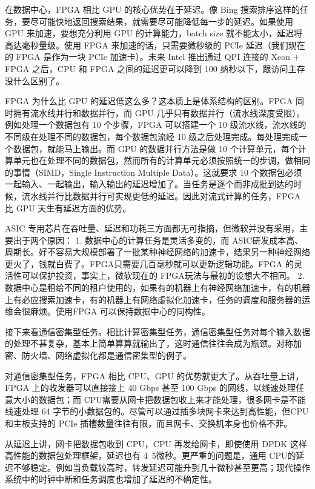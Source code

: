 在数据中心，FPGA 相比 GPU 的核心优势在于延迟。像 Bing 搜索排序这样的任务，要尽可能快地返回搜索结果，就需要尽可能降低每一步的延迟。如果使用 GPU 来加速，要想充分利用 GPU 的计算能力，batch size 就不能太小，延迟将高达毫秒量级。使用 FPGA 来加速的话，只需要微秒级的 PCIe 延迟（我们现在的 FPGA 是作为一块 PCIe 加速卡）。未来 Intel 推出通过 QPI 连接的 Xeon + FPGA 之后，CPU 和 FPGA 之间的延迟更可以降到 100 纳秒以下，跟访问主存没什么区别了。

FPGA 为什么比 GPU 的延迟低这么多？这本质上是体系结构的区别。FPGA 同时拥有流水线并行和数据并行，而 GPU 几乎只有数据并行（流水线深度受限）。例如处理一个数据包有 10 个步骤，FPGA 可以搭建一个 10 级流水线，流水线的不同级在处理不同的数据包，每个数据包流经 10 级之后处理完成。每处理完成一个数据包，就能马上输出。而 GPU 的数据并行方法是做 10 个计算单元，每个计算单元也在处理不同的数据包，然而所有的计算单元必须按照统一的步调，做相同的事情（SIMD，Single Instruction Multiple Data）。这就要求 10 个数据包必须一起输入、一起输出，输入输出的延迟增加了。当任务是逐个而非成批到达的时候，流水线并行比数据并行可实现更低的延迟。因此对流式计算的任务，FPGA 比 GPU 天生有延迟方面的优势。

ASIC 专用芯片在吞吐量、延迟和功耗三方面都无可指摘，但微软并没有采用，主要出于两个原因：
1.	数据中心的计算任务是灵活多变的，而 ASIC研发成本高、周期长。好不容易大规模部署了一批某种神经网络的加速卡，结果另一种神经网络更火了，钱就白费了。FPGA只需要几百毫秒就可以更新逻辑功能。FPGA 的灵活性可以保护投资，事实上，微软现在的 FPGA玩法与最初的设想大不相同。
2.	数据中心是租给不同的租户使用的，如果有的机器上有神经网络加速卡，有的机器上有必应搜索加速卡，有的机器上有网络虚拟化加速卡，任务的调度和服务器的运维会很麻烦。使用FPGA 可以保持数据中心的同构性。

接下来看通信密集型任务。相比计算密集型任务，通信密集型任务对每个输入数据的处理不甚复杂，基本上简单算算就输出了，这时通信往往会成为瓶颈。对称加密、防火墙、网络虚拟化都是通信密集型的例子。

对通信密集型任务，FPGA 相比 CPU、GPU 的优势就更大了。从吞吐量上讲，FPGA 上的收发器可以直接接上 40 Gbps 甚至 100 Gbps 的网线，以线速处理任意大小的数据包；而 CPU需要从网卡把数据包收上来才能处理，很多网卡是不能线速处理 64 字节的小数据包的。尽管可以通过插多块网卡来达到高性能，但CPU 和主板支持的 PCIe 插槽数量往往有限，而且网卡、交换机本身也价格不菲。

从延迟上讲，网卡把数据包收到 CPU，CPU 再发给网卡，即使使用 DPDK 这样高性能的数据包处理框架，延迟也有 4~5微秒。更严重的问题是，通用 CPU的延迟不够稳定。例如当负载较高时，转发延迟可能升到几十微秒甚至更高；现代操作系统中的时钟中断和任务调度也增加了延迟的不确定性。

